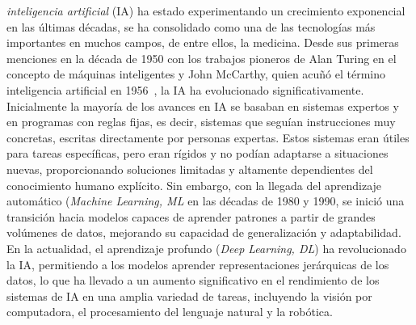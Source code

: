  \emph{inteligencia artificial} (IA) ha estado experimentando un crecimiento exponencial en las últimas décadas, se ha consolidado como una de las tecnologías más importantes en muchos campos, de entre ellos, la medicina. Desde sus primeras menciones en la década de 1950 con los trabajos pioneros de Alan Turing en el concepto de máquinas inteligentes y John McCarthy, quien acuñó el término inteligencia artificial en 1956~\cite{mccarthy1956ai}, la IA ha evolucionado significativamente. Inicialmente la mayoría de los avances en IA se basaban en sistemas expertos y en programas con reglas fijas, es decir, sistemas que seguían instrucciones muy concretas, escritas directamente por personas expertas. Estos sistemas eran útiles para tareas específicas, pero eran rígidos y no podían adaptarse a situaciones nuevas, proporcionando soluciones limitadas y altamente dependientes del conocimiento humano explícito. Sin embargo, con la llegada del aprendizaje automático (\emph{Machine Learning, ML} en las décadas de 1980 y 1990, se inició una transición hacia modelos capaces de aprender patrones a partir de grandes volúmenes de datos, mejorando su capacidad de generalización y adaptabilidad. En la actualidad, el aprendizaje profundo (\emph{Deep Learning, DL}) ha revolucionado la IA, permitiendo a los modelos aprender representaciones jerárquicas de los datos, lo que ha llevado a un aumento significativo en el rendimiento de los sistemas de IA en una amplia variedad de tareas, incluyendo la visión por computadora, el procesamiento del lenguaje natural y la robótica.

